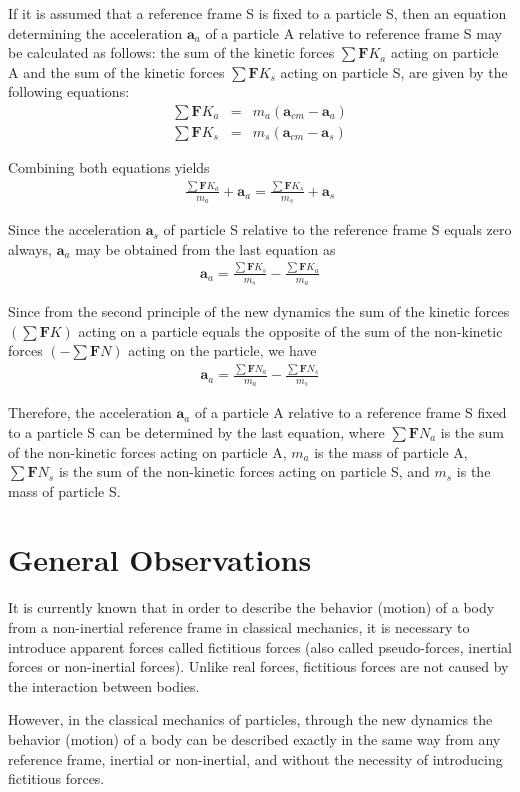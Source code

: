 \documentclass[12pt]{article}
\newcommand{\vA}{\mathbf{a}}
\newcommand{\vF}{\mathbf{F}}
\newcommand{\nK}{{\scriptstyle K}}
\newcommand{\nN}{{\scriptstyle N}}
\newcommand{\mM}{m}
\newcommand{\ra}{_a}
\newcommand{\rs}{_s}
\newcommand{\rcm}{_{cm}}
\begin{document}
\par If it is assumed that a reference frame S is fixed to a particle S, then an equation determining the acceleration $\vA\ra$ of a particle A relative to reference frame S may be calculated as follows: the sum of the kinetic forces $\sum \vF\nK\ra$ acting on particle A and the sum of the kinetic forces $\sum \vF\nK\rs$ acting on particle S, are given by the following equations:
\begin{eqnarray*}
\sum \vF\nK\ra & = & \mM\ra(\vA\rcm - \vA\ra) \\
\sum \vF\nK\rs & = & \mM\rs(\vA\rcm - \vA\rs)
\end{eqnarray*}
\par Combining both equations yields
\begin{eqnarray*}
\frac{\sum \vF\nK\ra}{\mM\ra} + \vA\ra = \frac{\sum \vF\nK\rs}{\mM\rs} + \vA\rs
\end{eqnarray*}
\par Since the acceleration $\vA\rs$ of particle S relative to the reference frame S equals zero always, $\vA\ra$ may be obtained from the last equation as
\begin{eqnarray*}
\vA\ra = \frac{\sum \vF\nK\rs}{\mM\rs} - \frac{\sum \vF\nK\ra}{\mM\ra}
\end{eqnarray*}
\par Since from the second principle of the new dynamics the sum of the kinetic forces $(\sum \vF\nK)$ acting on a particle equals the opposite of the sum of the non-kinetic forces $(-\sum \vF\nN)$ acting on the particle, we have
\begin{eqnarray*}
\vA\ra = \frac{\sum \vF\nN\ra}{\mM\ra} - \frac{\sum \vF\nN\rs}{\mM\rs}
\end{eqnarray*}
\par Therefore, the acceleration $\vA\ra$ of a particle A relative to a reference frame S fixed to a particle S can be determined by the last equation, where $\sum \vF\nN\ra$ is the sum of the non-kinetic forces acting on particle A, $\mM\ra$ is the mass of particle A, $\sum \vF\nN\rs$ is the sum of the non-kinetic forces acting on particle S, and $\mM\rs$ is the mass of particle S.

\bigskip

{\centering\section{General Observations}}

\par It is currently known that in order to describe the behavior (motion) of a body from a non-inertial reference frame in classical mechanics, it is necessary to introduce apparent forces called fictitious forces (also called pseudo-forces, inertial forces or non-inertial forces). Unlike real forces, fictitious forces are not caused by the interaction between bodies.
\par However, in the classical mechanics of particles, through the new dynamics the behavior (motion) of a body can be described exactly in the same way from any reference frame, inertial or non-inertial, and without the necessity of introducing fictitious forces.
\end{document}
